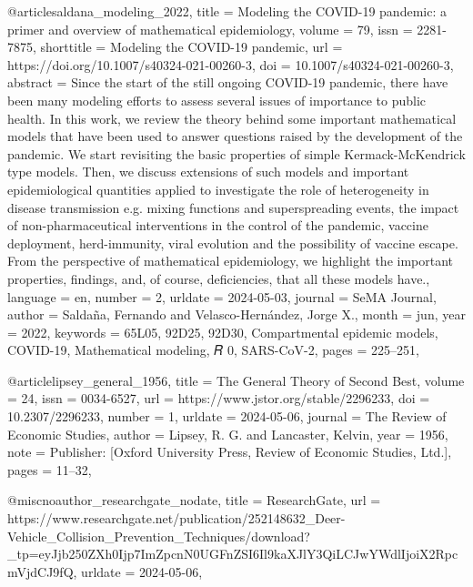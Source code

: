 {{{{@article{saldana_modeling_2022,
	title = {Modeling the {COVID}-19 pandemic: a primer and overview of mathematical epidemiology},
	volume = {79},
	issn = {2281-7875},
	shorttitle = {Modeling the {COVID}-19 pandemic},
	url = {https://doi.org/10.1007/s40324-021-00260-3},
	doi = {10.1007/s40324-021-00260-3},
	abstract = {Since the start of the still ongoing COVID-19 pandemic, there have been many modeling efforts to assess several issues of importance to public health. In this work, we review the theory behind some important mathematical models that have been used to answer questions raised by the development of the pandemic. We start revisiting the basic properties of simple Kermack-McKendrick type models. Then, we discuss extensions of such models and important epidemiological quantities applied to investigate the role of heterogeneity in disease transmission e.g. mixing functions and superspreading events, the impact of non-pharmaceutical interventions in the control of the pandemic, vaccine deployment, herd-immunity, viral evolution and the possibility of vaccine escape. From the perspective of mathematical epidemiology, we highlight the important properties, findings, and, of course, deficiencies, that all these models have.},
	language = {en},
	number = {2},
	urldate = {2024-05-03},
	journal = {SeMA Journal},
	author = {Saldaña, Fernando and Velasco-Hernández, Jorge X.},
	month = jun,
	year = {2022},
	keywords = {65L05, 92D25, 92D30, Compartmental epidemic models, COVID-19, Mathematical modeling, 𝑅
0, SARS-CoV-2},
	pages = {225--251},
}

@article{lipsey_general_1956,
	title = {The {General} {Theory} of {Second} {Best}},
	volume = {24},
	issn = {0034-6527},
	url = {https://www.jstor.org/stable/2296233},
	doi = {10.2307/2296233},
	number = {1},
	urldate = {2024-05-06},
	journal = {The Review of Economic Studies},
	author = {Lipsey, R. G. and Lancaster, Kelvin},
	year = {1956},
	note = {Publisher: [Oxford University Press, Review of Economic Studies, Ltd.]},
	pages = {11--32},
}

@misc{noauthor_researchgate_nodate,
	title = {{ResearchGate}},
	url = {https://www.researchgate.net/publication/252148632_Deer-Vehicle_Collision_Prevention_Techniques/download?_tp=eyJjb250ZXh0Ijp7ImZpcnN0UGFnZSI6Il9kaXJlY3QiLCJwYWdlIjoiX2RpcmVjdCJ9fQ},
	urldate = {2024-05-06},
}

}}}}
